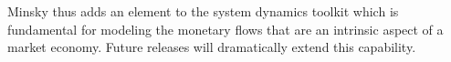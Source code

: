 Minsky thus adds an element to the system dynamics toolkit which is
fundamental for modeling the monetary flows that are an intrinsic
aspect of a market economy. Future releases will dramatically extend
this capability. 







